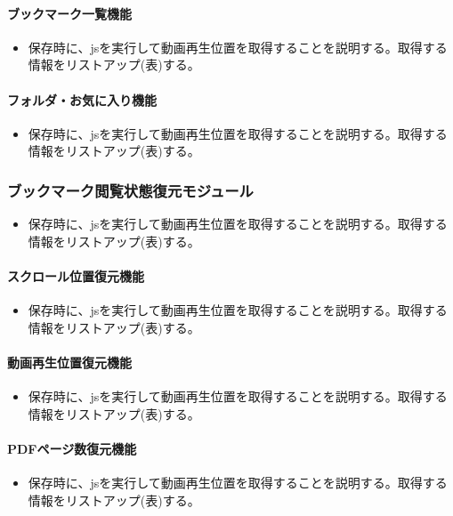 \paragraph{ブックマーク一覧機能}
\begin{itemize}
  \item 保存時に、jsを実行して動画再生位置を取得することを説明する。取得する情報をリストアップ(表)する。
\end{itemize}

\paragraph{フォルダ・お気に入り機能}
\begin{itemize}
  \item 保存時に、jsを実行して動画再生位置を取得することを説明する。取得する情報をリストアップ(表)する。
\end{itemize}

\subsubsection{ブックマーク閲覧状態復元モジュール}
\begin{itemize}
  \item 保存時に、jsを実行して動画再生位置を取得することを説明する。取得する情報をリストアップ(表)する。
\end{itemize}

\paragraph{スクロール位置復元機能}
\begin{itemize}
  \item 保存時に、jsを実行して動画再生位置を取得することを説明する。取得する情報をリストアップ(表)する。
\end{itemize}

\paragraph{動画再生位置復元機能}
\begin{itemize}
  \item 保存時に、jsを実行して動画再生位置を取得することを説明する。取得する情報をリストアップ(表)する。
\end{itemize}

\paragraph{PDFページ数復元機能}
\begin{itemize}
  \item 保存時に、jsを実行して動画再生位置を取得することを説明する。取得する情報をリストアップ(表)する。
\end{itemize}

